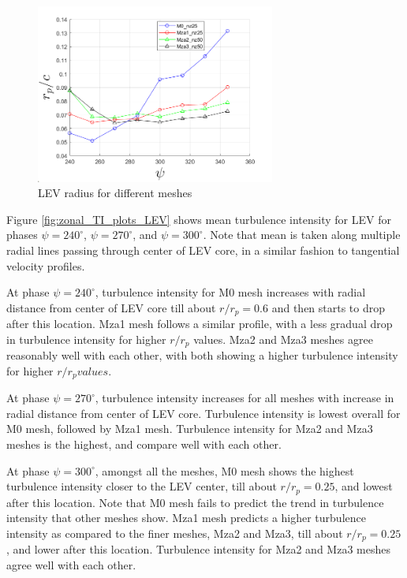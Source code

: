 \begin{figure}[H]
	\centering
	\includegraphics[width=0.7\textwidth]{figures/zonal_adapt_results/LEV/LEV_radius_vp}
	\caption{ LEV radius for different meshes}
	\label{fig:zonal_LEV_radius}
\end{figure}

Figure \ref{fig:zonal_TI_plots_LEV} shows mean turbulence intensity for LEV for phases $\psi = 240^\circ$, $\psi = 270^\circ$, and $\psi = 300^\circ$. 
Note that mean is taken along multiple radial lines passing through center of LEV core, in a similar fashion to tangential velocity profiles.

At phase $\psi = 240^\circ$, turbulence intensity for M0 mesh increases with radial distance from center of LEV core till about $r/r_p = 0.6$ and then starts to drop after this location.
Mza1 mesh follows a similar profile, with a less gradual drop in turbulence intensity for higher $r/r_p $ values.
Mza2 and Mza3 meshes agree reasonably well with each other, with both showing a higher turbulence intensity for higher $r/r_p values$.


At phase $\psi = 270^\circ$, turbulence intensity increases for all meshes with increase in radial distance from center of LEV core.
Turbulence intensity is lowest overall for M0 mesh, followed by Mza1 mesh. Turbulence intensity for Mza2 and Mza3 meshes is the highest, and compare well with each other.

At phase $\psi = 300^\circ$, amongst all the meshes, M0 mesh shows the highest turbulence intensity closer to the LEV center, till about $r/r_p = 0.25$, and lowest after this location.
Note that M0 mesh fails to predict the trend in turbulence intensity that other meshes show.
Mza1 mesh predicts a higher turbulence intensity as compared to the finer meshes, Mza2 and Mza3, till about $r/r_p = 0.25$, and lower after this location.
Turbulence intensity for Mza2 and Mza3 meshes agree well with each other. 


